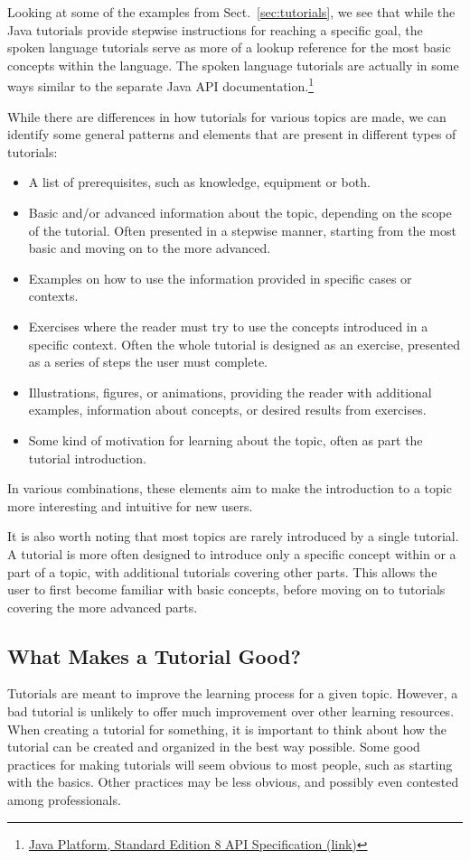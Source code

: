 \noindent
Looking at some of the examples from Sect.~\ref{sec:tutorials}, we see that while the Java tutorials provide stepwise instructions for reaching a specific goal, the spoken language tutorials serve as more of a lookup reference for the most basic concepts within the language. The spoken language tutorials are actually in some ways similar to the separate Java API documentation.\footnote{\href{http://docs.oracle.com/javase/8/docs/api/index.html}{Java Platform, Standard Edition 8
API Specification (link)}}

\noindent
While there are differences in how tutorials for various topics are made, we can identify some general patterns and elements that are present in different types of tutorials:
\begin{itemize}
	\item A list of prerequisites, such as knowledge, equipment or both.
	\item Basic and/or advanced information about the topic, depending on the scope of the tutorial. Often presented in a stepwise manner, starting from the most basic and moving on to the more advanced.
	\item Examples on how to use the information provided in specific cases or contexts.
	\item Exercises where the reader must try to use the concepts introduced in a specific context. Often the whole tutorial is designed as an exercise, presented as a series of steps the user must complete.
	\item Illustrations, figures, or animations, providing the reader with additional examples, information about concepts, or desired results from exercises.
	\item Some kind of motivation for learning about the topic, often as part the tutorial introduction.
\end{itemize}

\noindent
In various combinations, these elements aim to make the introduction to a topic more interesting and intuitive for new users.

\noindent
It is also worth noting that most topics are rarely introduced by a single tutorial. A tutorial is more often designed to introduce only a specific concept within or a part of a topic, with additional tutorials covering other parts. This allows the user to first become familiar with basic concepts, before moving on to tutorials covering the more advanced parts.

\subsection{What Makes a Tutorial Good?}
\label{sec:good_tutorials}
Tutorials are meant to improve the learning process for a given topic. However, a bad tutorial is unlikely to offer much improvement over other learning resources. When creating a tutorial for something, it is important to think about how the tutorial can be created and organized in the best way possible. Some good practices for making tutorials will seem obvious to most people, such as starting with the basics. Other practices may be less obvious, and possibly even contested among professionals.

